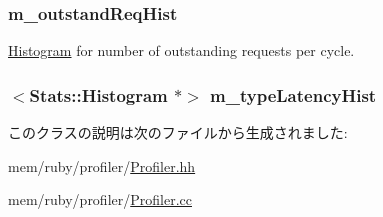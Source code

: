 \label{classProfiler_a8e022aebc37a4b83df56956874befd75}
\hypertarget{classProfiler_a24e9160c0860bc93a5f57de63544fe65}{
\subsubsection[{m\_\-outstandReqHist}]{ {\bf m\_\-outstandReqHist}}}
\label{classProfiler_a24e9160c0860bc93a5f57de63544fe65}


\hyperlink{classHistogram}{Histogram} for number of outstanding requests per cycle. \hypertarget{classProfiler_a21453ca0672126e1c0e204b7c60b3340}{
\subsubsection[{m\_\-typeLatencyHist}]{$<${\bf Stats::Histogram} $\ast$$>$ {\bf m\_\-typeLatencyHist}}}
\label{classProfiler_a21453ca0672126e1c0e204b7c60b3340}


このクラスの説明は次のファイルから生成されました:\begin{DoxyCompactItemize}
\item 
mem/ruby/profiler/\hyperlink{Profiler_8hh}{Profiler.hh}\item 
mem/ruby/profiler/\hyperlink{Profiler_8cc}{Profiler.cc}\end{DoxyCompactItemize}
